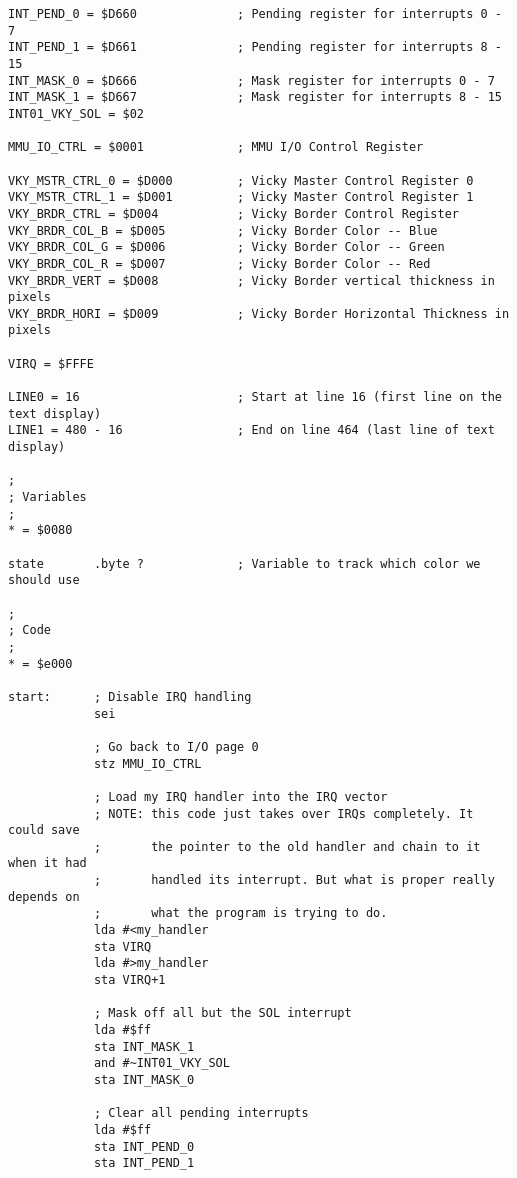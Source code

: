 \begin{verbatim}
INT_PEND_0 = $D660              ; Pending register for interrupts 0 - 7
INT_PEND_1 = $D661              ; Pending register for interrupts 8 - 15
INT_MASK_0 = $D666              ; Mask register for interrupts 0 - 7
INT_MASK_1 = $D667              ; Mask register for interrupts 8 - 15
INT01_VKY_SOL = $02

MMU_IO_CTRL = $0001             ; MMU I/O Control Register

VKY_MSTR_CTRL_0 = $D000         ; Vicky Master Control Register 0
VKY_MSTR_CTRL_1 = $D001         ; Vicky Master Control Register 1
VKY_BRDR_CTRL = $D004           ; Vicky Border Control Register
VKY_BRDR_COL_B = $D005          ; Vicky Border Color -- Blue
VKY_BRDR_COL_G = $D006          ; Vicky Border Color -- Green
VKY_BRDR_COL_R = $D007          ; Vicky Border Color -- Red
VKY_BRDR_VERT = $D008           ; Vicky Border vertical thickness in pixels
VKY_BRDR_HORI = $D009           ; Vicky Border Horizontal Thickness in pixels

VIRQ = $FFFE

LINE0 = 16                      ; Start at line 16 (first line on the text display)
LINE1 = 480 - 16                ; End on line 464 (last line of text display)

;
; Variables
;
* = $0080

state       .byte ?             ; Variable to track which color we should use

;
; Code
;
* = $e000

start:      ; Disable IRQ handling
            sei

            ; Go back to I/O page 0
            stz MMU_IO_CTRL

            ; Load my IRQ handler into the IRQ vector
            ; NOTE: this code just takes over IRQs completely. It could save
            ;       the pointer to the old handler and chain to it when it had
            ;       handled its interrupt. But what is proper really depends on
            ;       what the program is trying to do.
            lda #<my_handler
            sta VIRQ
            lda #>my_handler
            sta VIRQ+1

            ; Mask off all but the SOL interrupt
            lda #$ff
            sta INT_MASK_1
            and #~INT01_VKY_SOL
            sta INT_MASK_0

            ; Clear all pending interrupts
            lda #$ff
            sta INT_PEND_0
            sta INT_PEND_1


\end{verbatim}
